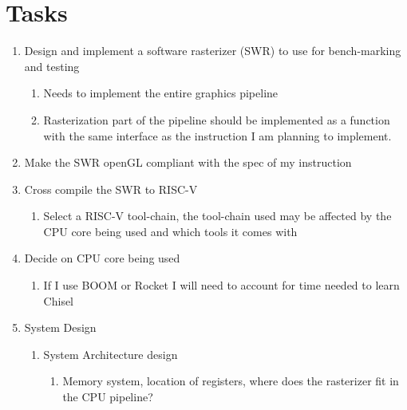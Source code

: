 \section{Tasks}\label{sec:MVPProjectTasks}
\begin{enumerate} 
  \item Design and implement a software rasterizer (SWR) to use for bench-marking and testing

  \begin{enumerate}
    \item Needs to implement the entire graphics pipeline
    \item Rasterization part of the pipeline should be implemented as a function with the same interface as the instruction I am planning to implement.
  \end{enumerate}
    
    \item Make the SWR openGL compliant with the spec of my instruction
    \item Cross compile the SWR to RISC-V
    \begin{enumerate}
        \item Select a RISC-V tool-chain, the tool-chain used may be affected by the CPU core being used and which tools it comes with
    \end{enumerate}
    
    \item Decide on CPU core being used
    \begin{enumerate}
        \item If I use BOOM or Rocket I will need to account for time needed to learn Chisel
    \end{enumerate}
    
    \item System Design
    \begin{enumerate}
        \item System Architecture design 
        \begin{enumerate}
            \item Memory system, location of registers, where does the rasterizer fit in the CPU pipeline?
        \end{enumerate}
        

\end{enumerate}
\end{enumerate}
